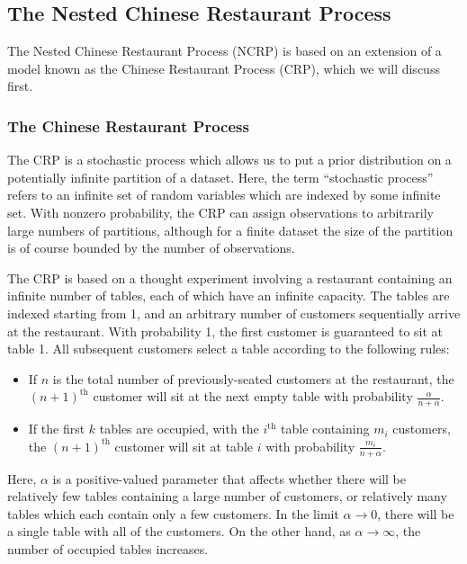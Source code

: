 \documentclass{article}
\newcommand{\nth}{^{\text{th}}}
\begin{document}
\subsection{The Nested Chinese Restaurant Process}

The Nested Chinese Restaurant Process (NCRP) is based on an extension of a model known as the Chinese Restaurant Process (CRP), which we will discuss first.

\subsubsection{The Chinese Restaurant Process}

The CRP is a stochastic process which allows us to put a prior distribution on a potentially infinite partition of a dataset.
Here, the term ``stochastic process'' refers to an infinite set of random variables which are indexed by some infinite set.
With nonzero probability, the CRP can assign observations to arbitrarily large numbers of partitions, although for a finite dataset the size of the partition is of course bounded by the number of observations.

The CRP is based on a thought experiment involving a restaurant containing an infinite number of tables, each of which have an infinite capacity.
The tables are indexed starting from 1, and an arbitrary number of customers sequentially arrive at the restaurant.
With probability 1, the first customer is guaranteed to sit at table 1.
All subsequent customers select a table according to the following rules:
\begin{itemize}
\item If $n$ is the total number of previously-seated customers at the restaurant, the $(n+1)\nth$ customer will sit at the next empty table with probability $\frac{\alpha}{n + \alpha}$.
\item If the first $k$ tables are occupied, with the $i\nth$ table containing $m_i$ customers, the $(n+1)\nth$ customer will sit at table $i$ with probability $\frac{m_i}{n+\alpha}$.
\end{itemize}
Here, $\alpha$ is a positive-valued parameter that affects whether there will be relatively few tables containing a large number of customers, or relatively many tables which each contain only a few customers.
In the limit $\alpha \to 0$, there will be a single table with all of the customers.
On the other hand, as $\alpha \to \infty$, the number of occupied tables increases.
\end{document}
